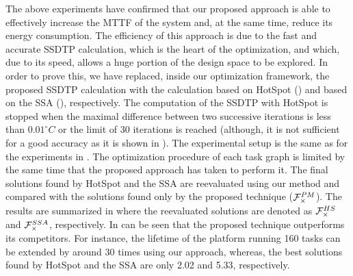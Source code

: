 The above experiments have confirmed that our proposed approach is able to effectively increase the MTTF of the system and, at the same time, reduce its energy consumption. The efficiency of this approach is due to the fast and accurate SSDTP calculation, which is the heart of the optimization, and which, due to its speed, allows a huge portion of the design space to be explored. In order to prove this, we have replaced, inside our optimization framework, the proposed SSDTP calculation with the calculation based on HotSpot () and based on the SSA (), respectively. The computation of the SSDTP with HotSpot is stopped when the maximal difference between two successive iterations is less than $0.01^\circ C$ or the limit of 30 iterations is reached (although, it is not sufficient for a good accuracy as it is shown in ). The experimental setup is the same as for the experiments in . The optimization procedure of each task graph is limited by the same time that the proposed approach has taken to perform it. The final solutions found by HotSpot and the SSA are reevaluated using our method and compared with the solutions found only by the proposed technique ($\mathcal{F}_{\times}^{PM}$). The results are summarized in  where the reevaluated solutions are denoted as $\mathcal{F}_{\times}^{HS}$ and $\mathcal{F}_{\times}^{SSA}$, respectively. In can be seen that the proposed technique outperforms its competitors. For instance, the lifetime of the platform running 160 tasks can be extended by around 30 times using our approach, whereas, the best solutions found by HotSpot and the SSA are only 2.02 and 5.33, respectively.

